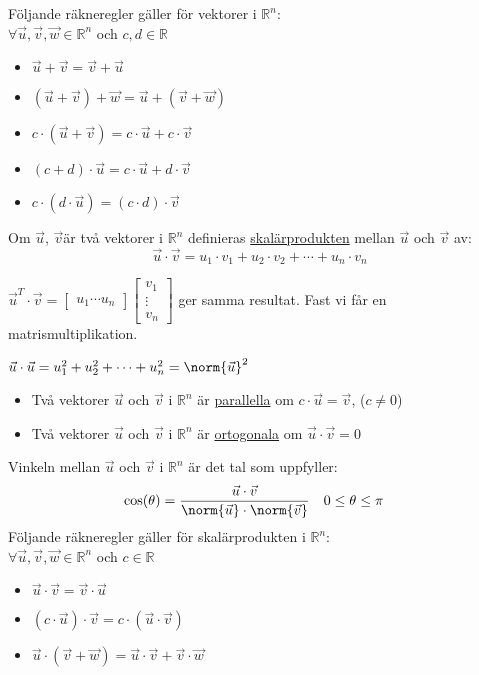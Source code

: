 Följande räkneregler gäller för vektorer i $\mathbb{R}^n$:\\
$\forall \vec{u}, \vec{v}, \vec{w} \in \mathbb{R}^n$ och $c,d \in \mathbb{R}$
\begin{itemize}
	\item $\vec{u} + \vec{v} = \vec{v} + \vec{u}$
	\item $(\vec{u} + \vec{v}) + \vec{w} = \vec{u} + (\vec{v} + \vec{w})$
	\item $c \cdot (\vec{u} + \vec{v}) = c \cdot \vec{u} + c \cdot \vec{v}$
	\item $(c + d) \cdot \vec{u} = c \cdot \vec{u} + d \cdot \vec{v}$
	\item $c \cdot (d \cdot \vec{u}) = (c \cdot d) \cdot \vec{v}$
\end{itemize}
\begin{Def}
    Om $\vec{u}$, $\vec{v}$är två vektorer i $\mathbb{R}^n$ definieras \underline{skalärprodukten} mellan $\vec{u}$ och $\vec{v}$ av:
    \[
        \vec{u} \cdot \vec{v} = u_1 \cdot v_1 + u_2 \cdot v_2 + \cdots + u_n \cdot v_n
    \]
\end{Def}
\begin{Rem}
    $\vec{u}^T \cdot \vec{v} = \begin{bmatrix} u_1 \cdots u_n \end{bmatrix}\begin{bmatrix} v_1\\\vdots\\v_n \end{bmatrix}$ ger samma resultat. Fast vi får en matrismultiplikation.
\end{Rem}
\begin{Rem}
    $\vec{u} \cdot \vec{u} = u_1^2 + u_2^2 + \cdots + u_n^2 = \norm{\vec{u}}^2$
\end{Rem}
\begin{itemize}
	\item Två vektorer $\vec{u}$ och $\vec{v}$ i $\mathbb{R}^n$ är \underline{parallella} om $c \cdot \vec{u} = \vec{v}$, ($c \neq 0$)
	\item Två vektorer $\vec{u}$ och $\vec{v}$ i $\mathbb{R}^n$ är \underline{ortogonala} om $\vec{u} \cdot \vec{v} = 0$
\end{itemize}
Vinkeln mellan $\vec{u}$ och $\vec{v}$ i $\mathbb{R}^n$ är det tal som uppfyller:
\begin{align*}
&\cos(\theta) = \frac{\vec{u} \cdot \vec{v}}{\norm{\vec{u}} \cdot \norm{\vec{v}}}
&& 0 \le \theta \le \pi
\end{align*}
Följande räkneregler gäller för skalärprodukten i $\mathbb{R}^n$:\\
$\forall \vec{u}, \vec{v}, \vec{w} \in \mathbb{R}^n$ och $c \in \mathbb{R}$
\begin{itemize}
	\item $\vec{u} \cdot \vec{v} = \vec{v} \cdot \vec{u}$
	\item $(c \cdot \vec{u}) \cdot \vec{v} = c \cdot (\vec{u} \cdot \vec{v})$
	\item $\vec{u} \cdot (\vec{v} + \vec{w}) = \vec{u} \cdot \vec{v} + \vec{v} \cdot \vec{w}$
\end{itemize}
